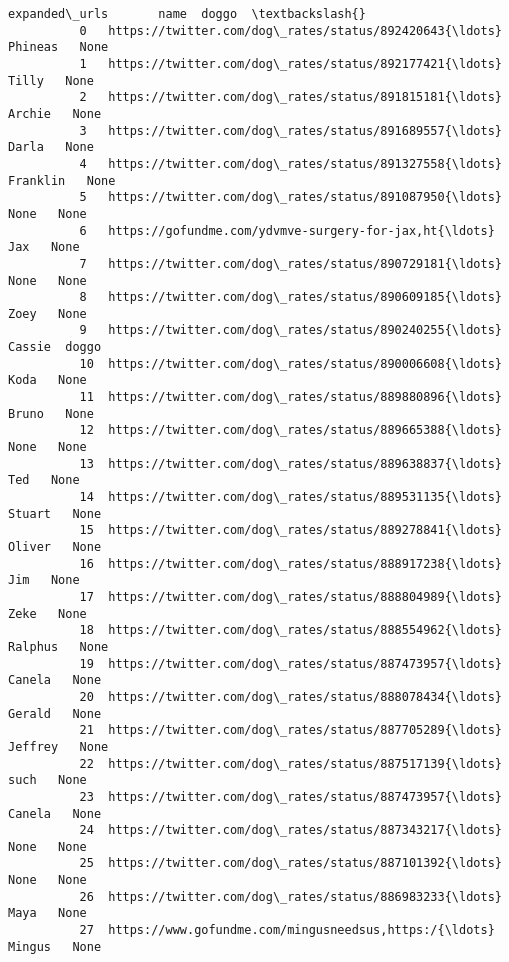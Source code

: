 \documentclass[11pt]{article}
\begin{document}
\begin{Verbatim}[commandchars=\\\{\}]
                                                  expanded\_urls       name  doggo  \textbackslash{}
          0   https://twitter.com/dog\_rates/status/892420643{\ldots}    Phineas   None   
          1   https://twitter.com/dog\_rates/status/892177421{\ldots}      Tilly   None   
          2   https://twitter.com/dog\_rates/status/891815181{\ldots}     Archie   None   
          3   https://twitter.com/dog\_rates/status/891689557{\ldots}      Darla   None   
          4   https://twitter.com/dog\_rates/status/891327558{\ldots}   Franklin   None   
          5   https://twitter.com/dog\_rates/status/891087950{\ldots}       None   None   
          6   https://gofundme.com/ydvmve-surgery-for-jax,ht{\ldots}        Jax   None   
          7   https://twitter.com/dog\_rates/status/890729181{\ldots}       None   None   
          8   https://twitter.com/dog\_rates/status/890609185{\ldots}       Zoey   None   
          9   https://twitter.com/dog\_rates/status/890240255{\ldots}     Cassie  doggo   
          10  https://twitter.com/dog\_rates/status/890006608{\ldots}       Koda   None   
          11  https://twitter.com/dog\_rates/status/889880896{\ldots}      Bruno   None   
          12  https://twitter.com/dog\_rates/status/889665388{\ldots}       None   None   
          13  https://twitter.com/dog\_rates/status/889638837{\ldots}        Ted   None   
          14  https://twitter.com/dog\_rates/status/889531135{\ldots}     Stuart   None   
          15  https://twitter.com/dog\_rates/status/889278841{\ldots}     Oliver   None   
          16  https://twitter.com/dog\_rates/status/888917238{\ldots}        Jim   None   
          17  https://twitter.com/dog\_rates/status/888804989{\ldots}       Zeke   None   
          18  https://twitter.com/dog\_rates/status/888554962{\ldots}    Ralphus   None   
          19  https://twitter.com/dog\_rates/status/887473957{\ldots}     Canela   None   
          20  https://twitter.com/dog\_rates/status/888078434{\ldots}     Gerald   None   
          21  https://twitter.com/dog\_rates/status/887705289{\ldots}    Jeffrey   None   
          22  https://twitter.com/dog\_rates/status/887517139{\ldots}       such   None   
          23  https://twitter.com/dog\_rates/status/887473957{\ldots}     Canela   None   
          24  https://twitter.com/dog\_rates/status/887343217{\ldots}       None   None   
          25  https://twitter.com/dog\_rates/status/887101392{\ldots}       None   None   
          26  https://twitter.com/dog\_rates/status/886983233{\ldots}       Maya   None   
          27  https://www.gofundme.com/mingusneedsus,https:/{\ldots}     Mingus   None   

\end{Verbatim}
\end{document}
